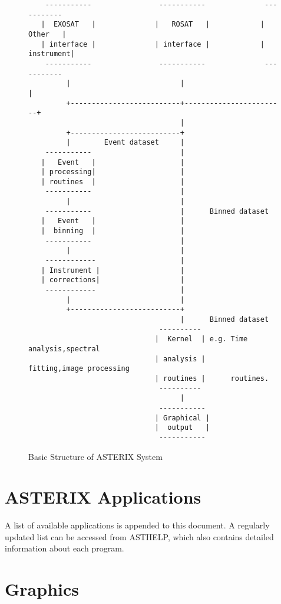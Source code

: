 \begin{figure}
\begin{verbatim}
    -----------                -----------              -----------
   |  EXOSAT   |              |   ROSAT   |            |   Other   |
   | interface |              | interface |            | instrument|
    -----------                -----------              -----------
         |                          |                        |
         +--------------------------+------------------------+ 
                                    |
         +--------------------------+
         |        Event dataset     |     
    -----------                     |
   |   Event   |                    |
   | processing|                    |
   | routines  |                    |
    -----------                     |
         |                          |
    -----------                     |      Binned dataset
   |   Event   |                    |
   |  binning  |                    |
    -----------                     |    
         |                          |
    ------------                    |
   | Instrument |                   |
   | corrections|                   |
    ------------                    |
         |                          |                    
         +--------------------------+
                                    |      Binned dataset
                               ----------
                              |  Kernel  | e.g. Time analysis,spectral
                              | analysis |      fitting,image processing
                              | routines |      routines.
                               ----------          
                                    |
                               -----------
                              | Graphical |
                              |  output   |
                               -----------
\end{verbatim}
\caption{Basic Structure of ASTERIX System}
\label{fig:str}
\end{figure}

\section{ASTERIX Applications   }

A list of available applications is appended to this document. A regularly 
updated list can be accessed from ASTHELP, which also contains detailed 
information about each program.

\section{Graphics }

